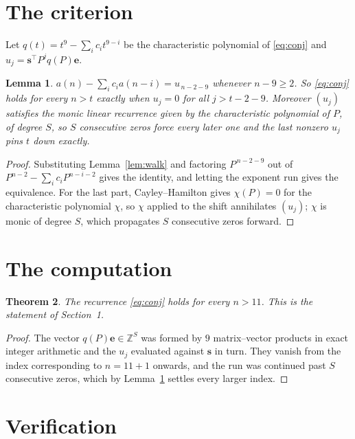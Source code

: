 \documentclass[11pt,a4paper]{article}
\theoremstyle{plain}
\newtheorem{theorem}{Theorem}
\newtheorem{lemma}[theorem]{Lemma}
\theoremstyle{definition}
\begin{document}
\section{The criterion}

Let $q(t)=t^{9}-\sum_i c_i t^{9-i}$ be the characteristic polynomial of
\eqref{eq:conj} and $u_j=\mathbf{s}^{\!\top}P^{j}q(P)\mathbf{e}$.

\begin{lemma}\label{lem:crit}
$a(n)-\sum_i c_i a(n-i)=u_{\,n-2-9}$ whenever $n-9\ge2$. So \eqref{eq:conj}
holds for every $n>t$ exactly when $u_j=0$ for all $j>t-2-9$. Moreover $(u_j)$
satisfies the monic linear recurrence given by the characteristic polynomial of $P$, of
degree $S$, so $S$ consecutive zeros force every later one and the last nonzero $u_j$ pins
$t$ down exactly.
\end{lemma}

\begin{proof}
Substituting Lemma~\ref{lem:walk} and factoring $P^{\,n-2-9}$ out of
$P^{n-2}-\sum_i c_i P^{n-i-2}$ gives the identity, and letting the exponent run gives the
equivalence. For the last part, Cayley--Hamilton gives $\chi(P)=0$ for the characteristic
polynomial $\chi$, so $\chi$ applied to the shift annihilates $(u_j)$; $\chi$ is monic of
degree $S$, which propagates $S$ consecutive zeros forward.
\end{proof}

\section{The computation}

\begin{theorem}
The recurrence \eqref{eq:conj} holds for every $n>11$. This is the statement of
Section~1.
\end{theorem}

\begin{proof}
The vector $q(P)\mathbf{e}\in\mathbb{Z}^{S}$ was formed by $9$ matrix--vector
products in exact integer arithmetic and the $u_j$ evaluated against $\mathbf{s}$ in turn.
They vanish from the index corresponding to $n=11+1$ onwards, and the run was continued
past $S$ consecutive zeros, which by Lemma~\ref{lem:crit} settles every larger index.
\end{proof}

\section{Verification}
\end{document}
